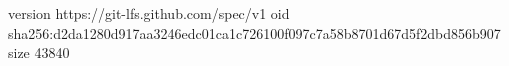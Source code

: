 version https://git-lfs.github.com/spec/v1
oid sha256:d2da1280d917aa3246edc01ca1c726100f097c7a58b8701d67d5f2dbd856b907
size 43840
